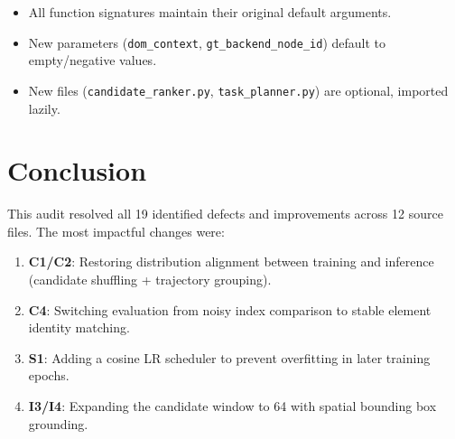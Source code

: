 \documentclass[11pt,a4paper]{article}
\begin{document}
\begin{itemize}
\item All function signatures maintain their original default arguments.
\item New parameters (\texttt{dom\_context}, \texttt{gt\_backend\_node\_id})
  default to empty/negative values.
\item New files (\texttt{candidate\_ranker.py}, \texttt{task\_planner.py})
  are optional, imported lazily.
\end{itemize}


\section{Conclusion}

This audit resolved all 19 identified defects and improvements across
12 source files. The most impactful changes were:

\begin{enumerate}
\item \textbf{C1/C2}: Restoring distribution alignment between training
  and inference (candidate shuffling + trajectory grouping).
\item \textbf{C4}: Switching evaluation from noisy index comparison to
  stable element identity matching.
\item \textbf{S1}: Adding a cosine LR scheduler to prevent
  overfitting in later training epochs.
\item \textbf{I3/I4}: Expanding the candidate window to 64 with spatial
  bounding box grounding.
\end{enumerate}
\end{document}
